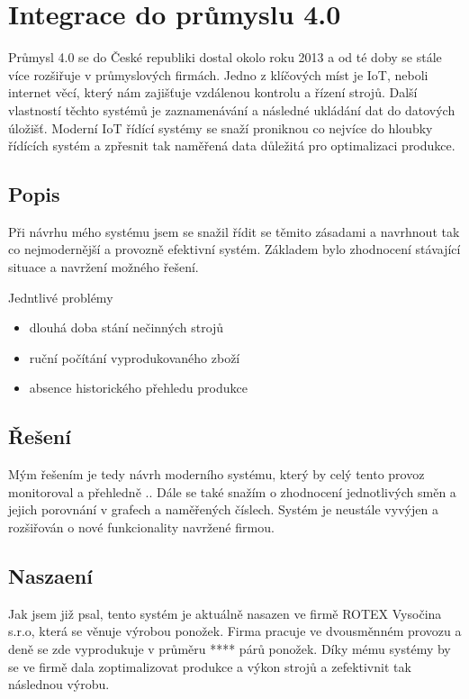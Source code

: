 \chapter{Integrace do průmyslu 4.0}
Průmysl 4.0 se do České republiki dostal okolo roku 2013 a od té doby se stále více rozšiřuje v průmyslových firmách.
Jedno z klíčových míst je IoT, neboli internet věcí, který nám zajišťuje vzdálenou kontrolu a řízení strojů.
Další vlastností těchto systémů je zaznamenávání a následné ukládání dat do datových úložišť.
Moderní IoT řídící systémy se snaží proniknou co nejvíce do hloubky řídících systém a zpřesnit tak naměřená data důležitá pro optimalizaci produkce.   

\section{Popis}
Při návrhu mého systému jsem se snažil řídit se těmito zásadami a navrhnout tak co nejmodernější a provozně efektivní systém.
Základem bylo zhodnocení stávající situace a navržení možného řešení.

Jedntlivé problémy
\begin{itemize}
    \item dlouhá doba stání nečinných strojů
    \item ruční počítání vyprodukovaného zboží
    \item absence historického přehledu produkce
\end{itemize}

\fxnote[author=JA]{\textcolor{mygreen}{GRAF}}

\section{Řešení}
Mým řešením je tedy návrh moderního systému, který by celý tento provoz monitoroval a přehledně ..
Dále se také snažím o zhodnocení jednotlivých směn a jejich porovnání v grafech a naměřených číslech.
Systém je neustále vyvýjen a rozšiřován o nové funkcionality navržené firmou.


\section{Naszaení}
Jak jsem již psal, tento systém je aktuálně nasazen ve firmě ROTEX Vysočina s.r.o, která se věnuje výrobou ponožek. 
Firma pracuje ve dvousměnném provozu a deně se zde vyprodukuje v průměru **** párů ponožek.
Díky mému systémy by se ve firmě dala zoptimalizovat produkce a výkon strojů a zefektivnit tak následnou výrobu. 

\fxnote[author=JA]{\textcolor{mygreen}{Obrázek pletárny}}

\newpage